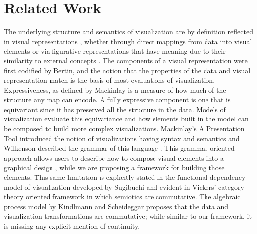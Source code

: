 \documentclass[journal]{vgtc}                %
\begin{document}
\section{Related Work}
The underlying structure and semantics of visualization are by definition reflected in visual representations \cite{friendlyBriefHistoryData2008}, whether through direct mappings from data into visual elements or via figurative representations that have meaning due to their similarity to external concepts \cite{byrneAcquiredCodesMeaning2016}. The components of a visual representation were first codified by Bertin\cite{bertinSemiologyGraphicsDiagrams2011a}, and the notion that the properties of the data and visual representation match is the basis of most evaluations of visualization. Expressiveness, as defined by Mackinlay \cite{mackinlayAUTOMATICDESIGNGRAPHICAL1987, mackinlayAutomatingDesignGraphical1986} is a measure of how much of the structure any map can encode. A fully expressive component is one that is equivariant since it has preserved all the structure in the data. 
Models of visualization evaluate this equivariance and how elements built in the model can be composed to build more complex visualizations. Mackinlay's A Presentation Tool introduced the notion of visualizations having syntax and semantics \cite{mackinlayAutomatingDesignGraphical1986} and Wilkenson described the grammar of this language \cite{wilkinsonGrammarGraphics2005}. This grammar oriented approach allows users to describe how to compose visual elements into a graphical design \cite{wongsuphasawatNavigatingWideWorld2021}, while we are proposing a framework for building those elements. This same limitation is explicitly stated in the functional dependency model of visualization developed by Sugibuchi\cite{sugibuchiFramwork2009} and evident in Vickers' category theory oriented framework in which semiotics are commutative. The algebraic process model by Kindlmann and Scheideggar proposes that the data and visualization transformations are commutative; while similar to our framework, it is missing any explicit mention of continuity. 
\end{document}

